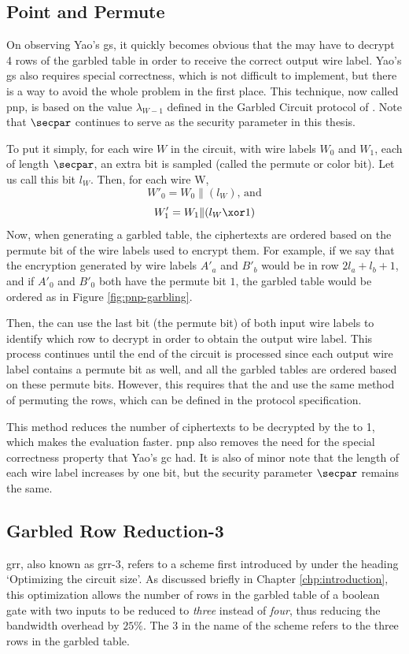 \subsection{Point and Permute}
\label{subsec:pointandpermute}
On observing Yao's \acrlong{gs}, it quickly becomes obvious that the \cevaluator may have to decrypt 4 rows of the garbled table in order to receive the correct output wire label. Yao's \acrlong{gs} also requires special correctness, which is not difficult to implement, but there is a way to avoid the whole problem in the first place. This technique, now called \acrlong{pnp}, is based on the value $\lambda_{W-1}$ defined in the Garbled Circuit protocol of \citeauthor{STOC:BeaMicRog90} \cite{STOC:BeaMicRog90}. Note that $\secpar$ continues to serve as the security parameter in this thesis.

To put it simply, for each wire $W$ in the circuit, with wire labels $W_0$ and $W_1$, each of length $\secpar$, an extra bit is sampled (called the permute or color bit). Let us call this bit $l_W$. Then, for each wire W,
\[W'_0 = W_0 \| (l_W) \text{, and}\]
\[W'_1 = W_1 \| (l_W\xor1)\]
Now, when generating a garbled table, the ciphertexts are ordered based on the permute bit of the wire labels used to encrypt them. For example, if we say that the encryption generated by wire labels $A'_a$ and $B'_b$ would be in row $2l_a+l_b+1$, and if $A'_0$ and $B'_0$ both have the permute bit $1$, the garbled table would be ordered as in Figure \ref{fig:pnp-garbling}.

Then, the \cevaluator can use the last bit (the permute bit) of both input wire labels to identify which row to decrypt in order to obtain the output wire label. This process continues until the end of the circuit is processed since each output wire label contains a permute bit as well, and all the garbled tables are ordered based on these permute bits. However, this requires that the \cevaluator and \cgarbler use the same method of permuting the rows, which can be defined in the protocol specification. 

This method reduces the number of ciphertexts to be decrypted by the \cevaluator to 1, which makes the evaluation faster. \acrlong{pnp} also removes the need for the special correctness property that Yao's \acrlong{gc} had. It is also of minor note that the length of each wire label increases by one bit, but the security parameter $\secpar$ remains the same.
\subsection{Garbled Row Reduction-3}
\label{subsec:grr3}
\acrlong{grr}, also known as \acrlong{grr}-3, refers to a scheme first introduced by \citeauthor{ACMCEC:NaPiSu99} \cite[Section 2.5]{ACMCEC:NaPiSu99} under the heading `Optimizing the circuit size'. As discussed briefly in Chapter \ref{chp:introduction}, this optimization allows the number of rows in the garbled table of a boolean gate with two inputs to be reduced to \textit{three} instead of \textit{four}, thus reducing the bandwidth overhead by $25\%$. The 3 in the name of the scheme refers to the three rows in the garbled table.

